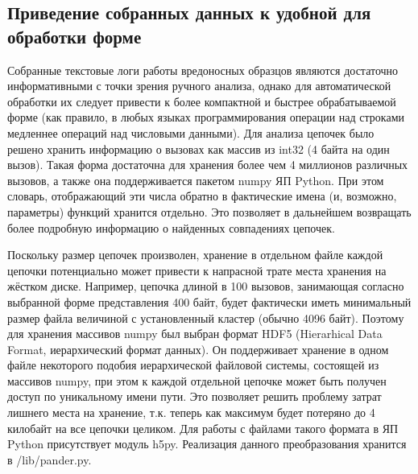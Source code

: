 \subsection {Приведение собранных данных к удобной для обработки форме}
Собранные текстовые логи работы вредоносных образцов являются достаточно информативными с точки зрения ручного анализа, однако для автоматической обработки их следует привести к более компактной и быстрее обрабатываемой форме (как правило, в любых языках программирования операции над строками медленнее операций над числовыми данными). Для анализа цепочек было решено хранить информацию о вызовах как массив из int32 (4 байта на один вызов). Такая форма достаточна для хранения более чем 4 миллионов различных вызовов, а также она поддерживается пакетом numpy ЯП Python. При этом словарь, отображающий эти числа обратно в фактические имена (и, возможно, параметры) функций хранится отдельно. Это позволяет в дальнейшем возвращать более подробную информацию о найденных совпадениях цепочек.

Поскольку размер цепочек произволен, хранение в отдельном файле каждой цепочки потенциально может привести к напрасной трате места хранения на жёстком диске. Например, цепочка длиной в 100 вызовов, занимающая согласно выбранной форме представления 400 байт, будет фактически иметь минимальный размер файла величиной с установленный кластер (обычно 4096 байт). Поэтому для хранения массивов numpy был выбран формат HDF5 (Hierarhical Data Format, иерархический формат данных). Он поддерживает хранение в одном файле некоторого подобия иерархической файловой системы, состоящей из массивов numpy, при этом к каждой отдельной цепочке может быть получен доступ по уникальному имени пути. Это позволяет решить проблему затрат лишнего места на хранение, т.к. теперь как максимум будет потеряно до 4  килобайт на все цепочки целиком. Для работы с файлами такого формата в ЯП Python присутствует модуль h5py.
 Реализация данного преобразования хранится в /lib/pander.py.
